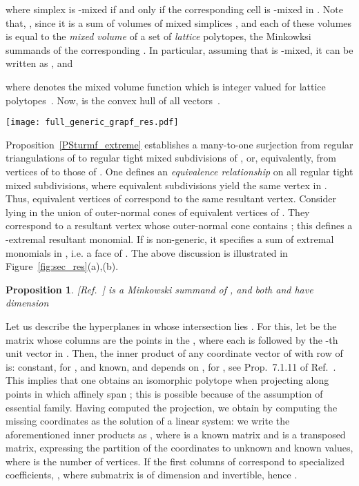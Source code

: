 \documentclass{article}
\newtheorem{proposition}{Proposition}
\newcommand\refcite[1]{\citealp{#1}} \newcommand\citess[1]{\textsuperscript{\textup{\citealp{#1}}}}
\begin{document}
where simplex  is -mixed if and only if the corresponding cell 
is -mixed in . 
Note that, , since it is
a sum of volumes of mixed simplices , and each of these volumes is
equal to the \emph{mixed volume}\citess{CLO2} of a set of \emph{lattice}
polytopes, the Minkowksi summands of the corresponding . In
particular, assuming that  is -mixed, it can be written as
, and

where  denotes the mixed volume function which is integer valued for 
lattice polytopes~\citess{CLO2}.
Now,  is the convex hull of all  vectors~\citess{GKZ,St94}.

\begin{figure*}[t] \centering
 \texttt{[image: full\_generic\_grapf\_res.pdf]}
 \caption{(a) 
The secondary polytope  of two triangles (dark, light grey) and one
segment
,
where  is defined as in Equation~\ref{EQ:Cayley};
vertices correspond to mixed subdivisions of the
Minkowski sum  and edges to flips between them
(b)
, whose vertices correspond to the dashed classes of .
Bold edges of , called cubical flips, map to edges of 
(c)
-dimensional  of 3 generic trinomials with f-vector ;
figure made with {\tt polymake}.
}
\label{fig:sec_res} \end{figure*}

Proposition~\ref{PSturmf_extreme} establishes
a many-to-one surjection from regular triangulations of  to
regular tight mixed subdivisions of , or, equivalently,
from vertices of  to those of .
One defines an {\em equivalence relationship} on all regular tight mixed
subdivisions, where equivalent subdivisions yield the same vertex in . 
Thus, equivalent vertices of  correspond to the same
resultant vertex.
Consider  lying in the union of
outer-normal cones of equivalent vertices of .
They correspond to a resultant vertex whose outer-normal cone
contains ; this defines a -extremal resultant monomial.
If  is non-generic, it specifies a sum of extremal monomials in ,
i.e. a face of .
The above discussion is illustrated in Figure~\ref{fig:sec_res}(a),(b).

\begin{proposition}\label{Psummand_dimRes}{\rm [Ref.~\refcite{GKZ}]}
 is a Minkowski summand of 
, and both  and  have 
dimension 
\end{proposition} 

Let us describe the  hyperplanes in whose intersection lies .
For this, let  be the  matrix whose columns are the
points in the , where each  is followed by
the -th unit vector in .
Then, the inner product of any coordinate vector of  with row 
of  is: constant, for , and known, and depends on ,
for , see Prop.~7.1.11 of Ref.~\refcite{GKZ}.
This implies that one obtains an isomorphic polytope when projecting
 along  points in  which affinely span ;
this is possible because of the assumption of essential family.
Having computed the projection, we obtain  by computing
the missing coordinates as the solution of a linear system:
we write the aforementioned inner products as , where 
is a known matrix and  is a transposed  matrix,
expressing the partition of the coordinates to unknown and known values,
where  is the number of  vertices. 
If the first  columns of  correspond to specialized coefficients, 
, where submatrix  is of dimension 
and invertible, hence .
\end{document}
